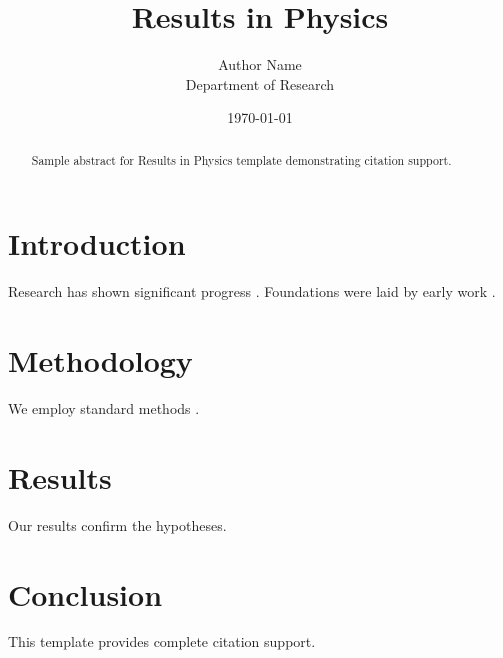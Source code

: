 ﻿\documentclass{elsarticle}
\title{Results in Physics}
\author{Author Name \\ \small Department of Research}
\date{\today}
\begin{document}
\maketitle

\begin{abstract}
Sample abstract for Results in Physics template demonstrating citation support.
\end{abstract}

\section{Introduction}
Research has shown significant progress \citep{einstein1905}. Foundations were laid by early work \citep{turing1950}.

\section{Methodology}
We employ standard methods \citep{knuth1984}.

\section{Results}
Our results confirm the hypotheses.

\section{Conclusion}
This template provides complete citation support.



\end{document}

